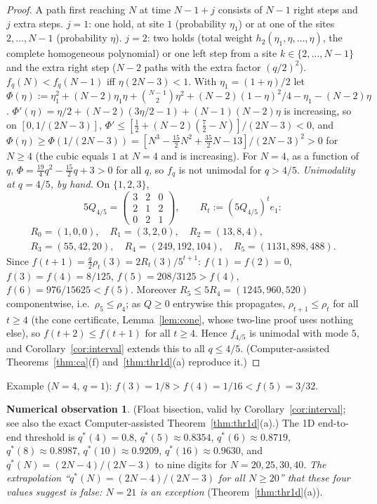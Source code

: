 \documentclass[11pt,a4paper]{article}
\theoremstyle{definition}
\newtheorem{observation}[theorem]{Numerical observation}
\begin{document}
\begin{proof}
A path first reaching $N$ at time $N-1+j$ consists of $N-1$ right steps and $j$ extra steps. $j=1$: one hold, at site $1$ (probability $\eta_1$) or at one of the sites $2,\dots,N-1$ (probability $\eta$). $j=2$: two holds (total weight $h_2(\eta_1,\eta,\dots,\eta)$, the complete homogeneous polynomial) or one left step from a site $k\in\{2,\dots,N-1\}$ and the extra right step ($N-2$ paths with the extra factor $(q/2)^2$). $f_q(N)<f_q(N-1)$ iff $\eta(2N-3)<1$. With $\eta_1=(1+\eta)/2$ let $\Phi(\eta):=\eta_1^2+(N-2)\eta_1\eta+\binom{N-1}2\eta^2+(N-2)(1-\eta)^2/4-\eta_1-(N-2)\eta$. $\Phi'(\eta)=\eta/2+(N-2)(3\eta/2-1)+(N-1)(N-2)\eta$ is increasing, so on $[0,1/(2N-3)]$, $\Phi'\le[\frac12+(N-2)(\frac72-N)]/(2N-3)<0$, and $\Phi(\eta)\ge\Phi(1/(2N-3))=[N^3-\frac{15}2N^2+\frac{35}2N-13]/(2N-3)^2>0$ for $N\ge4$ (the cubic equals $1$ at $N=4$ and is increasing). For $N=4$, as a function of $q$, $\Phi=\frac{19}4q^2-\frac{15}2q+3>0$ for all $q$, so $f_q$ is not unimodal for $q>4/5$. \emph{Unimodality at $q=4/5$, by hand.} On $\{1,2,3\}$,
\[5Q_{4/5}=\begin{pmatrix}3&2&0\\2&1&2\\0&2&1\end{pmatrix},\qquad R_t:=(5Q_{4/5})^te_1:\]
\begin{gather*}R_0=(1,0,0),\quad R_1=(3,2,0),\quad R_2=(13,8,4),\\ R_3=(55,42,20),\quad R_4=(249,192,104),\quad R_5=(1131,898,488).\end{gather*}
Since $f(t+1)=\frac q2\rho_t(3)=2R_t(3)/5^{t+1}$: $f(1)=f(2)=0$, $f(3)=f(4)=8/125$, $f(5)=208/3125>f(4)$, $f(6)=976/15625<f(5)$. Moreover $R_5\le5R_4=(1245,960,520)$ componentwise, i.e.\ $\rho_5\le\rho_4$; as $Q\ge0$ entrywise this propagates, $\rho_{t+1}\le\rho_t$ for all $t\ge4$ (the cone certificate, Lemma~\ref{lem:cone}, whose two-line proof uses nothing else), so $f(t+2)\le f(t+1)$ for all $t\ge4$. Hence $f_{4/5}$ is unimodal with mode $5$, and Corollary~\ref{cor:interval} extends this to all $q\le4/5$. (Computer-assisted Theorems~\ref{thm:ca}(f) and~\ref{thm:thr1d}(a) reproduce it.)
\end{proof}
Example ($N=4$, $q=1$): $f(3)=1/8>f(4)=1/16<f(5)=3/32$.

\begin{observation}\label{obs:1dthr}
(Float bisection, valid by Corollary~\ref{cor:interval}; see also the exact Computer-assisted Theorem~\ref{thm:thr1d}(a).) The 1D end-to-end threshold is $q^*(4)=0.8$, $q^*(5)\approx0.8354$, $q^*(6)\approx0.8719$, $q^*(8)\approx0.8987$, $q^*(10)\approx0.9209$, $q^*(16)\approx0.9630$, and $q^*(N)=(2N-4)/(2N-3)$ to nine digits for $N=20,25,30,40$. \emph{The extrapolation ``$q^*(N)=(2N-4)/(2N-3)$ for all $N\ge20$'' that these four values suggest is false: $N=21$ is an exception} (Theorem~\ref{thm:thr1d}(a)).
\end{observation}
\end{document}

